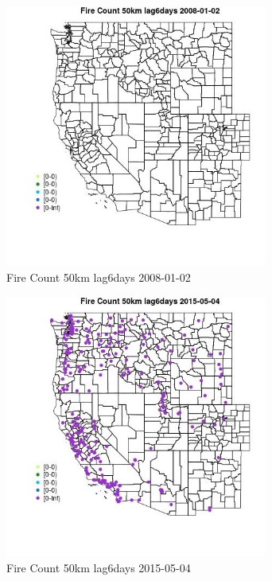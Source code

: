 \begin{figure} 
\centering  
\includegraphics[width=0.77\textwidth]{Code_Outputs/Report_ML_input_PM25_Step4_part_e_de_duplicated_aves_compiled_2019-05-18wNAs_MapObsFire_Count_50km_lag6days2008-01-02.jpg} 
\caption{\label{fig:Report_ML_input_PM25_Step4_part_e_de_duplicated_aves_compiled_2019-05-18wNAsMapObsFire_Count_50km_lag6days2008-01-02}Fire Count 50km lag6days 2008-01-02} 
\end{figure} 
 

\clearpage 

\begin{figure} 
\centering  
\includegraphics[width=0.77\textwidth]{Code_Outputs/Report_ML_input_PM25_Step4_part_e_de_duplicated_aves_compiled_2019-05-18wNAs_MapObsFire_Count_50km_lag6days2015-05-04.jpg} 
\caption{\label{fig:Report_ML_input_PM25_Step4_part_e_de_duplicated_aves_compiled_2019-05-18wNAsMapObsFire_Count_50km_lag6days2015-05-04}Fire Count 50km lag6days 2015-05-04} 
\end{figure} 
 

